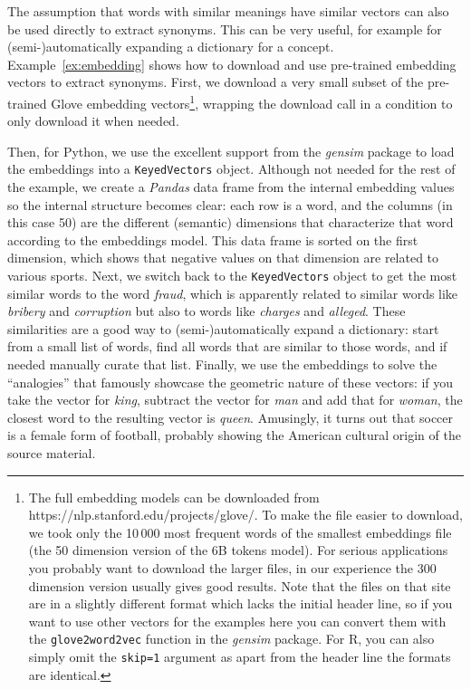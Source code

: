 The assumption that words with similar meanings have similar vectors can also be used directly to extract synonyms.
This can be very useful, for example for (semi-)automatically expanding a dictionary for a concept.
Example~\ref{ex:embedding} shows how to download and use pre-trained embedding vectors to extract synonyms.
First, we download a very small subset of the pre-trained Glove embedding vectors\footnote{The full embedding models can be downloaded from https://nlp.stanford.edu/projects/glove/. To make the file easier to download, we took only the 10\,000 most frequent words of the smallest embeddings file (the 50 dimension version of the 6B tokens model). For serious applications you probably want to download the larger files, in our experience the 300 dimension version usually gives good results. Note that the files on that site are in a slightly different format which lacks the initial header line, so if you want to use other vectors for the examples here you can convert them with the \texttt{glove2word2vec} function in the \emph{gensim} package. For R, you can also simply omit the \verb|skip=1| argument as apart from the header line the formats are identical.},
wrapping the download call in a condition to only download it when needed.

Then, for Python, we use the excellent support from the \emph{gensim} package to load the embeddings into a \texttt{KeyedVectors} object.
Although not needed for the rest of the example, we create a \textit{Pandas} data frame from the internal embedding values so the internal structure becomes clear: each row is a word, and the columns (in this case 50) are the different (semantic) dimensions that characterize that word according to the embeddings model.
This data frame is sorted on the first dimension, which shows that negative values on that dimension are related to various sports.
Next, we switch back to the \texttt{KeyedVectors} object to get the most similar words to the word \emph{fraud}, which is apparently related to similar words like \emph{bribery} and \emph{corruption} but also to words like \emph{charges} and \emph{alleged}.
These similarities are a good way to (semi-)automatically expand a dictionary: start from a small list of words,
find all words that are similar to those words, and if needed manually curate that list.
Finally, we use the embeddings to solve the ``analogies'' that famously showcase the geometric nature of these vectors:
if you take the vector for \emph{king}, subtract the vector for \emph{man} and add that for \emph{woman},
the closest word to the resulting vector is \emph{queen}.
Amusingly, it turns out that soccer is a female form of football, probably showing the American cultural origin of the source material.

